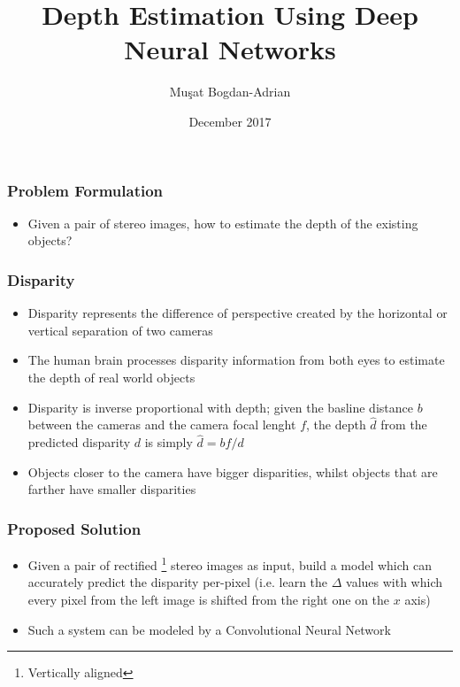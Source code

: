 \documentclass{beamer}
\title[Depth Estimation]{Depth Estimation Using Deep Neural Networks}
\author[Mu\c sat Bogdan-Adrian]{Mu\c sat Bogdan-Adrian}
\date{December 2017}
\begin{document}
\frame{\titlepage}

\begin{frame}
\frametitle{Problem Formulation}
\center
\begin{itemize}
	\item Given a pair of stereo images, how to estimate the depth of the existing objects?
\end{itemize}
\end{frame}

\begin{frame}
\frametitle{Disparity}
\center
\begin{itemize}
	\item Disparity represents the difference of perspective created by the horizontal or vertical separation of two cameras
	\item The human brain processes disparity information from both eyes to estimate the depth of real world objects
	\item Disparity is inverse proportional with depth; given the basline distance \(b\) between the cameras and the camera focal lenght \(f\), the depth \(\hat{d}\) from the predicted disparity \(d\) is simply \(\hat{d}=bf/d\)
	\item Objects closer to the camera have bigger disparities, whilst objects that are farther have smaller disparities
\end{itemize}
\end{frame}

\begin{frame}
\frametitle{Proposed Solution}
\center
\begin{itemize}
	\item Given a pair of rectified \footnote{Vertically aligned} stereo images as input, build a model which can accurately predict the disparity per-pixel (i.e. learn the \(\Delta\) values with which every pixel from the left image is shifted from the right one on the \(x\) axis)
	\item Such a system can be modeled by a Convolutional Neural Network
\end{itemize}
\end{frame}
\end{document}
